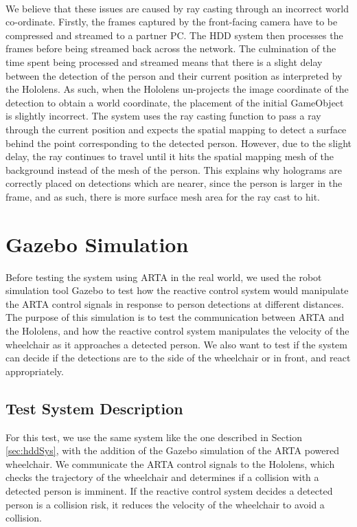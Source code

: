 \paragraph{} We believe that these issues are caused by ray casting through an incorrect world co-ordinate. Firstly, the frames captured by the front-facing camera have to be compressed and streamed to a partner PC. The HDD system then processes the frames before being streamed back across the network. The culmination of the time spent being processed and streamed means that there is a slight delay between the detection of the person and their current position as interpreted by the Hololens. As such, when the Hololens un-projects the image coordinate of the detection to obtain a world coordinate, the placement of the initial GameObject is slightly incorrect. The system uses the ray casting function to pass a ray through the current position and expects the spatial mapping to detect a surface behind the point corresponding to the detected person. However, due to the slight delay, the ray continues to travel until it hits the spatial mapping mesh of the background instead of the mesh of the person. This explains why holograms are correctly placed on detections which are nearer, since the person is larger in the frame, and as such, there is more surface mesh area for the ray cast to hit.

\section{Gazebo Simulation} \label{sec:gazeboSimTest}
Before testing the system using ARTA in the real world, we used the robot simulation tool Gazebo to test how the reactive control system would manipulate the ARTA control signals in response to person detections at different distances. The purpose of this simulation is to test the communication between ARTA and the Hololens, and how the reactive control system manipulates the velocity of the wheelchair as it approaches a detected person. We also want to test if the system can decide if the detections are to the side of the wheelchair or in front, and react appropriately. 

\subsection{Test System Description}
For this test, we use the same system like the one described in Section \ref{sec:hddSys}, with the addition of the Gazebo simulation of the ARTA powered wheelchair. We communicate the ARTA control signals to the Hololens, which checks the trajectory of the wheelchair and determines if a collision with a detected person is imminent. If the reactive control system decides a detected person is a collision risk, it reduces the velocity of the wheelchair to avoid a collision.

